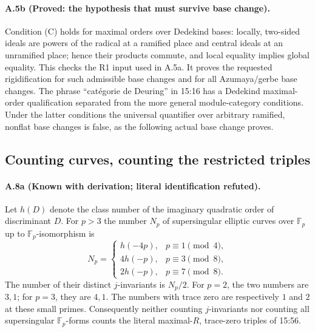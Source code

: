 \paragraph{A.5b (Proved: the hypothesis that must survive base change).}
Condition (C) holds for maximal orders over Dedekind bases: locally,
two-sided ideals are powers of the radical at a ramified place and
central ideals at an unramified place; hence their products commute,
and local equality implies global equality. This checks the R1 input
used in A.5a. It proves the requested rigidification for such admissible
base changes and for all Azumaya/gerbe base changes. The phrase
``catégorie de Deuring'' in 15:16 has a Dedekind maximal-order
qualification separated from the more general module-category
conditions. Under the latter conditions the universal quantifier over
arbitrary ramified, nonflat base changes is false, as the following
actual base change proves.



\subsection{Counting curves, counting the restricted triples}

\paragraph{A.8a (Known with derivation; literal identification refuted).}
Let $h(D)$ denote the class number of the imaginary quadratic order
of discriminant $D$. For $p>3$ the number $N_p$ of supersingular
elliptic curves over $\mathbb F_p$ up to $\mathbb F_p$-isomorphism is
\[
 N_p=\begin{cases}
 h(-4p),&p\equiv1\pmod4,\\
 4h(-p),&p\equiv3\pmod8,\\
 2h(-p),&p\equiv7\pmod8.
 \end{cases}
\]
The number of their distinct $j$-invariants is $N_p/2$.
For $p=2$, the two numbers are $3,1$; for $p=3$, they are $4,1$.
The numbers with trace zero are respectively $1$ and $2$ at these
small primes. Consequently neither counting $j$-invariants nor
counting all supersingular $\mathbb F_p$-forms counts the literal
maximal-$R$, trace-zero triples of 15:56.

